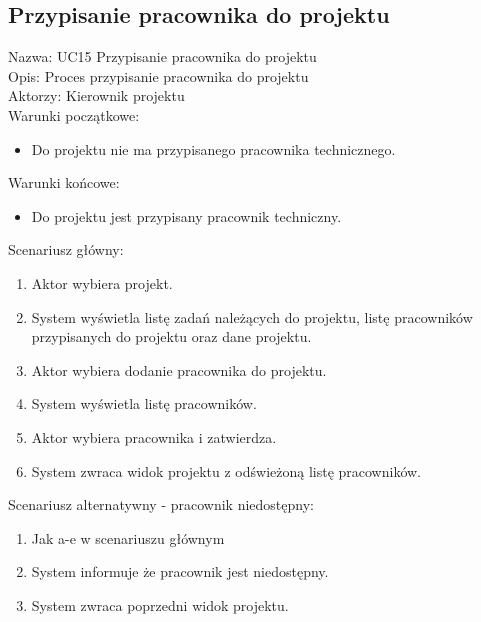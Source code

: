 \subsection{Przypisanie pracownika do projektu}
\begin{adjustwidth}{5em}{0pt}
Nazwa: UC15 Przypisanie pracownika do projektu \\
Opis: Proces przypisanie pracownika do projektu \\
Aktorzy: Kierownik projektu \\
Warunki początkowe:
\begin{itemize}
\item Do projektu nie ma przypisanego pracownika technicznego.
\end{itemize}
Warunki końcowe:
\begin{itemize}
\item Do projektu jest przypisany pracownik techniczny.
\end{itemize}
Scenariusz główny:
\begin{enumerate}
\item Aktor wybiera projekt.
\item System wyświetla listę zadań należących do projektu, listę pracowników przypisanych do projektu oraz dane projektu.
\item Aktor wybiera dodanie pracownika do projektu.
\item System wyświetla listę pracowników.
\item Aktor wybiera pracownika i zatwierdza.
\item System zwraca widok projektu z odświeżoną listę pracowników.
\end{enumerate}
Scenariusz alternatywny - pracownik niedostępny: 
\begin{enumerate}
\item Jak a-e w scenariuszu głównym
\item System informuje że pracownik jest niedostępny.
\item System zwraca poprzedni widok projektu.
\end{enumerate}
\end{adjustwidth}


